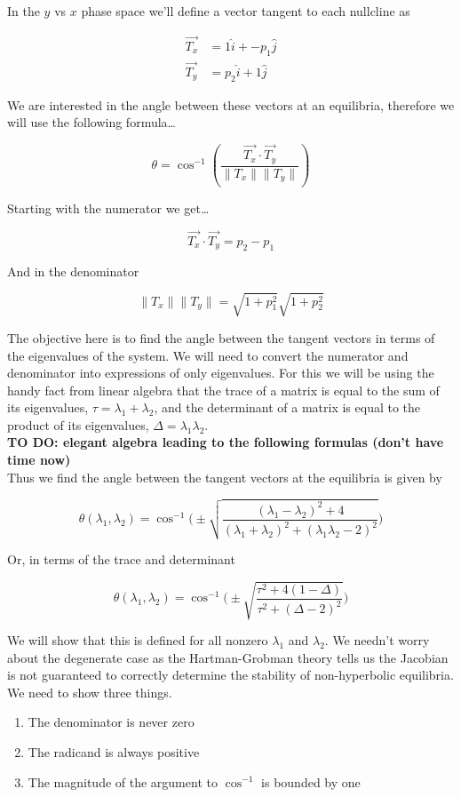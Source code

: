 \documentclass{article}
\begin{document}
\noindent In the $y$ vs $x$ phase space we'll define a vector tangent to each
nullcline as

\begin{align}
\vec{T_x} &= 1\hat{i} + -p_1\hat{j} \\
\vec{T_y} &= p_2\hat{i} + 1\hat{j} 
\end{align}

We are interested in the angle between these vectors at an equilibria,
therefore we will use the following formula\ldots{}

\[\theta = \cos^{-1}(\frac{\vec{T_x}\cdot \vec{T_y}}{\|T_x\| \|T_y\|})\]

Starting with the numerator we get\ldots{}

\[\vec{T_x}\cdot \vec{T_y} = p_2-p_1\]

And in the denominator

\[\|T_x\| \|T_y\| = \sqrt{1+p^2_1}\sqrt{1+p^2_2}\]

The objective here is to find the angle between the tangent vectors in
terms of the eigenvalues of the system. We will need to convert the
numerator and denominator into expressions of only eigenvalues. For this
we will be using the handy fact from linear algebra that the trace of a
matrix is equal to the sum of its eigenvalues,
$\tau=\lambda_1+\lambda_2$, and the determinant of a matrix is equal to
the product of its eigenvalues, $\Delta = \lambda_1 \lambda_2$. \\

\textbf{TO DO: elegant algebra leading to the following formulas (don't
have time now)} \\

Thus we find the angle between the tangent vectors at the equilibria is
given by

\[\theta(\lambda_1,\lambda_2) = \cos^{-1}\Bigg (\pm \sqrt{\frac{(\lambda_1-\lambda_2)^2+4}{(\lambda_1+\lambda_2)^2+(\lambda_1 \lambda_2-2)^2}}\Bigg )\]

Or, in terms of the trace and determinant

\[\theta(\lambda_1,\lambda_2) = \cos^{-1}\Bigg (\pm \sqrt{\frac{\tau^2+4(1-\Delta)}{\tau^2+(\Delta-2)^2}}\Bigg )\]

We will show that this is defined for all nonzero $\lambda_1$ and
$\lambda_2$. We needn't worry about the degenerate case as the
Hartman-Grobman theory tells us the Jacobian is not guaranteed to
correctly determine the stability of non-hyperbolic equilibria. We need
to show three things.

\begin{enumerate}
\def\labelenumi{\arabic{enumi}.}
\itemsep1pt\parskip0pt
\item
  The denominator is never zero
\item
  The radicand is always positive
\item
  The magnitude of the argument to $\cos^{-1}$ is bounded by one
\end{enumerate}
\end{document}
